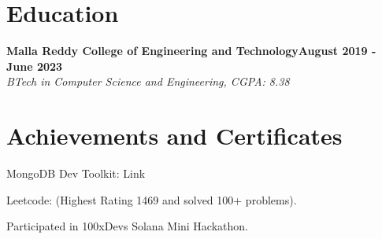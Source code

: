 \documentclass[letterpaper,10pt]{article}
\newcommand{\heading}[2]{
  \hspace{10pt}#1\hfill#2\\
}
\newcommand{\headingBf}[2]{
  \heading{\textbf{#1}}{\textbf{#2}}
}
\newcommand{\headingIt}[2]{
  \heading{\textit{#1}}{\textit{#2}}
}
\newenvironment{resume_list}{
  \vspace{-7pt}
  \begin{itemize}[itemsep=-2px, parsep=1pt, leftmargin=30pt]
}{
  \end{itemize}
}
\begin{document}
  \section{Education}
  \headingBf{Malla Reddy College of Engineering and Technology}{August 2019 - June 2023}
  \headingIt{BTech in Computer Science and Engineering, CGPA: 8.38}{}
  \section{Achievements and Certificates}
  \begin{resume_list}
    \item MongoDB Dev Toolkit:  Link
    \item Leetcode:  (Highest Rating 1469 and solved 100+ problems).
    \item Participated in 100xDevs Solana Mini Hackathon.
  \end{resume_list}
\end{document}
